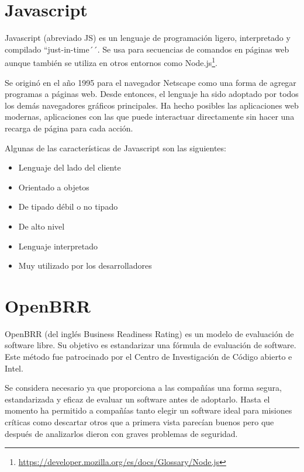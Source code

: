 \documentclass[a4paper, 12pt]{book}
\begin{document}
\section{Javascript}
\label{sec:Javascript}

Javascript\cite{website:Javascript} (abreviado JS) es un lenguaje de programación ligero, interpretado y compilado ``just-in-time´´. Se usa para secuencias de comandos en páginas web aunque también se utiliza en otros entornos como Node.js\footnote{\url{https://developer.mozilla.org/es/docs/Glossary/Node.js}}.

Se originó en el año 1995 para el navegador Netscape como una forma de agregar programas a páginas web. Desde entonces, el lenguaje ha sido adoptado por todos los demás navegadores gráficos principales. Ha hecho posibles las aplicaciones web modernas, aplicaciones con las que puede interactuar directamente sin hacer una recarga de página para cada acción.

Algunas de las características de Javascript son las siguientes:

\begin{itemize}
	\item Lenguaje del lado del cliente
	\item Orientado a objetos
	\item De tipado débil o no tipado
	\item De alto nivel
	\item Lenguaje interpretado
	\item Muy utilizado por los desarrolladores\\
\end{itemize}

\section{OpenBRR}
\label{sec:openbrr}

OpenBRR\cite{website:OpenBRR} (del inglés Business Readiness Rating) es un modelo de evaluación de software libre. Su objetivo es estandarizar una fórmula de evaluación de software. Este método fue patrocinado por el Centro de Investigación de Código abierto e Intel.

Se considera necesario ya que proporciona a las compañías una forma segura, estandarizada y eficaz de evaluar un software antes de adoptarlo. Hasta el momento ha permitido a compañías tanto elegir un software ideal para misiones críticas como descartar otros que a primera vista parecían buenos pero que después de analizarlos dieron con graves problemas de seguridad.
\end{document}

